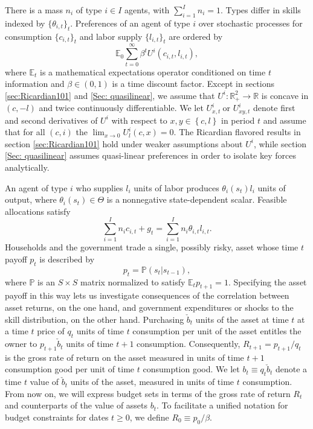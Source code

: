 \documentclass[thmsb,11pt]{article}
\begin{document}
There is a mass $n_{i}$ of type $i\in I$ agents, with $\sum_{i=1}^{I}n_{i}=1.$
Types differ in skills indexed by $\{\theta_{i,t}\}_t$.
Preferences of an agent of type $i$ over stochastic processes for consumption $\{c_{i,t}\}_{t}$ and labor supply $\{l_{i,t}\}_{t}$
are ordered by
\begin{equation}
\mathbb{E}_{0}\sum_{t=0}^{\infty}\beta^{t}U^{i}\left(c_{i,t},l_{i,t}\right),\label{utility lifetime}
\end{equation}
where $\mathbb{E}_{t}$ is a mathematical expectations operator conditioned on time $t$ information and
$\beta\in\left(0,1\right)$ is a time discount factor.
Except in sections  \ref{sec:Ricardian101} and \ref{Sec: quasilinear}, we assume that $U^{i}:\mathbb{R}%
_{+}^{2}\rightarrow \mathbb{R}$ is concave in $\left( c,-l\right) $ and
twice continuously differentiable. We let $U_{x,t}^{i}\ $or $U_{xy,t}^{i}$
denote first and second derivatives of $U^{i}$ with respect to $x,y\in
\left\{ c,l\right\} $ in period $t$ and assume that for all $(c,i)$ the $\lim_{x\rightarrow
0}U_{l}^{i}\left( c,x\right) =0$. The Ricardian flavored results in section \ref{sec:Ricardian101} hold under weaker assumptions about $U^{i}$,
while section \ref{Sec: quasilinear} assumes quasi-linear preferences in order to isolate key forces analytically.

An agent of type $i$ who supplies $l_{i}$ units of labor produces
$\theta_{i}\left(s_{t}\right)l_{i}$ units of output, where $\theta_{i}(s_{t})\in\Theta$
is a nonnegative state-dependent scalar. Feasible allocations satisfy
\begin{equation}
\label{eqn:feasiblity}
\sum_{i=1}^{I}n_{i}c_{i,t}+g_{t}=\sum_{i=1}^{I}n_{i}\theta_{i,t}l_{i,t}.
\end{equation}
\color{black}
Households and the government  trade a single, possibly risky, asset whose
\color{black}
time $t$ payoff $p_{t}$  is described by
\[
p_{t}=\mathbb{P}(s_{t}|s_{t-1}),
\]
where  $\mathbb{P}$ is an $S\times S$ matrix normalized to satisfy $\mathbb{E}_{t}p_{t+1}=1$.
Specifying the asset payoff in this way lets  us  investigate  consequences  of the correlation between asset returns, on the one hand,
and government expenditures or shocks to the skill distribution,  on the other hand.
Purchasing $\check b_t$ units of the asset at time $t$ at a time $t$ price of $q_t$ units of time $t$ consumption per unit of the asset
entitles the owner to $p_{t+1} \check b_t$ units of time $t+1$ consumption.  Consequently, $R_{t+1} = p_{t+1} / q_t$ is the gross rate of
return on the asset measured in units of time $t+1$ consumption good per unit of time $t$ consumption good.  We let $b_t \equiv q_t \check b_t$ denote
a time $t$ value of $\check b_t$ units of the asset, measured in units of time $t$ consumption.  From now on, we will express
 budget sets in terms of the gross rate of return $R_t$ and  counterparts of the value of assets $b_t$.
To facilitate a unified notation for budget constraints for dates $t \geq 0$, we define $R_0 \equiv p_0 / \beta$.
\color{black}
\end{document}
